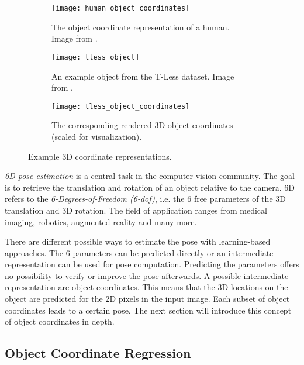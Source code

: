 \begin{figure}[!tbp]
	\centering
	\begin{subfigure}[t]{0.29\textwidth}
		\centering
    	\texttt{[image: human\_object\_coordinates]}
    	\caption{The object coordinate representation of a human. Image from \cite{tsharp}.}
    	\label{fig:human_object_coordinates}
	\end{subfigure}
	\hspace{5mm}
	\begin{subfigure}[t]{0.29\textwidth}
		\centering
    	\texttt{[image: tless\_object]}
    	\caption{An example object from the T-Less dataset. Image from \cite{tless}.}
    	\label{fig:tless_object}
	\end{subfigure}
	\hspace{5mm}
	\begin{subfigure}[t]{0.29\textwidth}
		\centering
    	\texttt{[image: tless\_object\_coordinates]}
    	\caption{The corresponding rendered 3D object coordinates (scaled for visualization).}
    	\label{fig:tless_object_coordinates}
	\end{subfigure}
	\caption{Example 3D coordinate representations.}
\end{figure} 

\textit{6D pose estimation} is a central task in the computer vision community. The goal is to retrieve the translation and rotation of an object relative to the camera. 6D refers to the \textit{6-Degrees-of-Freedom (6-\gls{dof})}, i.e. the 6 free parameters of the 3D translation and 3D rotation. The field of application ranges from medical imaging, robotics, augmented reality and many more.

There are different possible ways to estimate the pose with learning-based approaches. The 6 parameters can be predicted directly or an intermediate representation can be used for pose computation. Predicting the parameters offers no possibility to verify or improve the pose afterwards. A possible intermediate representation are object coordinates. This means that the 3D locations on the object are predicted for the 2D pixels in the input image. Each subset of object coordinates leads to a certain pose. The next section will introduce this concept of object coordinates in depth.

\subsection{Object Coordinate Regression} \label{objectcoordinates}

